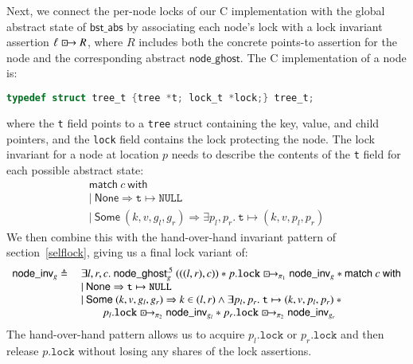 \documentclass[runningheads]{llncs}
\newcommand{\islock}{\boxdotright}
\newcommand{\treerep}{\ensuremath{\mathsf{bst\_abs}}}
\newcommand{\myhalf}[2]{\ensuremath{\mathsf{node\_ghost}^{.5}_{#1}\ (#2)}}
\begin{document}
Next, we connect the per-node locks of our C implementation with the global abstract state of $\treerep$ by associating each node's lock with a lock invariant assertion $\ell \islock R$, where $R$ includes both the concrete points-to assertion for the node and the corresponding abstract $\mathsf{node\_ghost}$. The C implementation of a node is:
\begin{lstlisting}[language = C,numbers = none]
typedef struct tree_t {tree *t; lock_t *lock;} tree_t;
\end{lstlisting}
where the \lstinline{t} field points to a \lstinline{tree} struct containing the key, value, and child pointers, and the \lstinline{lock} field contains the lock protecting the node. The lock invariant for a node at location $p$ needs to describe the contents of the \lstinline{t} field for each possible abstract state:
$$\begin{array}{l}
\mathsf{match}\ c\ \mathsf{with}\\
|\ \mathsf{None} \Rightarrow \texttt{t} \mapsto \texttt{NULL}\\
|\ \mathsf{Some}\ (k, v, g_l, g_r) \Rightarrow \exists p_l, p_r.\ \texttt{t} \mapsto (k, v, p_l, p_r)
\end{array}$$
We then combine this with the hand-over-hand invariant pattern of section~\ref{selflock}, giving us a final lock variant of:
$$\begin{array}{r l}
\mathsf{node\_inv}_g \triangleq \ &\exists l, r, c.\ \myhalf{g}{((l, r), c)} * p.\texttt{lock} \islock_{\pi_1} \mathsf{node\_inv}_g * \mathsf{match}\ c\ \mathsf{with}\\
&|\ \mathsf{None} \Rightarrow \texttt{t} \mapsto \texttt{NULL}\\
&|\ \mathsf{Some}\ (k, v, g_l, g_r) \Rightarrow k \in (l, r) \land \exists p_l, p_r.\ \texttt{t} \mapsto (k, v, p_l, p_r)\ * \\&\qquad p_l.\texttt{lock} \islock_{\pi_2} \mathsf{node\_inv}_{g_l} * p_r.\texttt{lock} \islock_{\pi_2} \mathsf{node\_inv}_{g_r}
\end{array}$$
The hand-over-hand pattern allows us to acquire $p_l.\texttt{lock}$ or $p_r.\texttt{lock}$ and then release $p.\texttt{lock}$ without losing any shares of the lock assertions.
\end{document}
